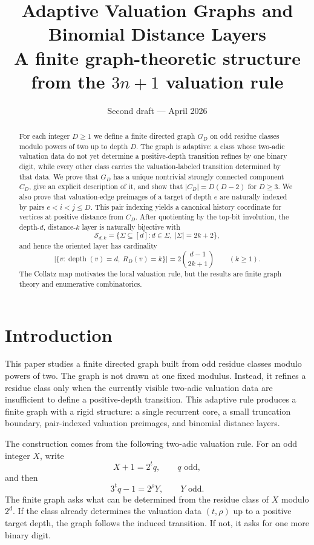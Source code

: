 \documentclass[11pt]{article}
\title{Adaptive Valuation Graphs and Binomial Distance Layers\\
\large A finite graph-theoretic structure from the \texorpdfstring{$3n+1$}{3n+1} valuation rule}
\author{}
\date{Second draft --- April 2026}
\theoremstyle{definition}
\theoremstyle{remark}
\newcommand{\depth}{\operatorname{depth}}
\newcommand{\Sfam}{\mathcal S}
\begin{document}
\maketitle

\begin{abstract}
For each integer $D\ge 1$ we define a finite directed graph $G_D$ on odd residue classes modulo powers of two up to depth $D$.  The graph is adaptive: a class whose two-adic valuation data do not yet determine a positive-depth transition refines by one binary digit, while every other class carries the valuation-labeled transition determined by that data.  We prove that $G_D$ has a unique nontrivial strongly connected component $C_D$, give an explicit description of it, and show that $|C_D|=D(D-2)$ for $D\ge3$.  We also prove that valuation-edge preimages of a target of depth $e$ are naturally indexed by pairs $e<i<j\le D$.  This pair indexing yields a canonical history coordinate for vertices at positive distance from $C_D$.  After quotienting by the top-bit involution, the depth-$d$, distance-$k$ layer is naturally bijective with
\[
\Sfam_{d,k}=\{\Sigma\subseteq[d]: d\in\Sigma,\ |\Sigma|=2k+2\},
\]
and hence the oriented layer has cardinality
\[
\bigl|\{v:\depth(v)=d,\ R_D(v)=k\}\bigr|=2\binom{d-1}{2k+1}\qquad(k\ge1).
\]
The Collatz map motivates the local valuation rule, but the results are finite graph theory and enumerative combinatorics.
\end{abstract}

\section{Introduction}

This paper studies a finite directed graph built from odd residue classes modulo powers of two.  The graph is not drawn at one fixed modulus.  Instead, it refines a residue class only when the currently visible two-adic valuation data are insufficient to define a positive-depth transition.  This adaptive rule produces a finite graph with a rigid structure: a single recurrent core, a small truncation boundary, pair-indexed valuation preimages, and binomial distance layers.

The construction comes from the following two-adic valuation rule.  For an odd integer $X$, write
\[
X+1=2^tq,\qquad q\text{ odd},
\]
and then
\[
3^tq-1=2^\rho Y,\qquad Y\text{ odd}.
\]
The finite graph asks what can be determined from the residue class of $X$ modulo $2^d$.  If the class already determines the valuation data $(t,\rho)$ up to a positive target depth, the graph follows the induced transition.  If not, it asks for one more binary digit.
\end{document}

